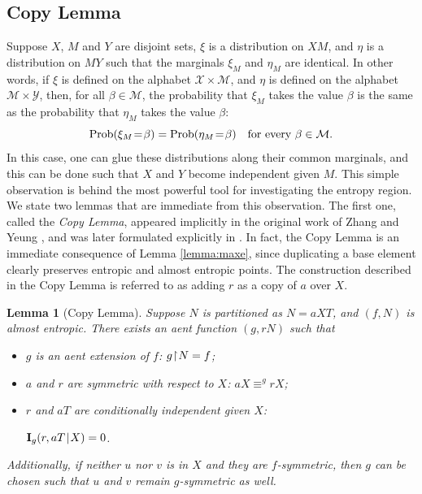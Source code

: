 \documentclass[a4paper]{IEEEtran}
\def\|{\mskip1.5mu{|}\mskip1.5mu}
\def\I{\mathbf I}
\def\m#1{\mskip 1.5mu{#1}\mskip 1.5mu}
\newcommand\restr{\mkern1mu{\upharpoonright}\mkern1mu}
\DeclareMathOperator\Prob{\mathrm{Prob}}
\newtheorem{lemma}[theorem]{Lemma}
\theoremstyle{definition}
\begin{document}
\subsection{Copy Lemma}\label{subsec:copy}

Suppose $X$, $M$ and $Y$ are disjoint sets, $\xi$ is a distribution on $XM$,
and $\eta$ is a distribution on $MY$ such that the marginals $\xi_M$ and
$\eta_M$ are identical. In other words, if $\xi$ is defined on the alphabet
$\mathcal X\times\mathcal M$, and $\eta$ is defined on the alphabet
$\mathcal M\times\mathcal Y$, then, for all $\beta\in\mathcal M$, the
probability that $\xi_M$ takes the value $\beta$ is the same as the
probability that $\eta_M$ takes the value $\beta$:
$$
   \Prob(\xi_M\m=\beta)=\Prob(\eta_M\m=\beta) ~~\mbox{ for every }
   \beta\in\mathcal M.
$$
In this case, one can glue these distributions along their common marginals,
and this can be done such that $X$ and $Y$ become independent given $M$. This
simple observation is behind the most powerful tool for investigating the
entropy region. We state two lemmas that are immediate from this observation.
The first one, called the \emph{Copy Lemma}, appeared implicitly in the
original work of Zhang and Yeung \cite{ZhY.conic, ZhY.ineq}, and was later
formulated explicitly in \cite{DFZ11}. In fact, the Copy Lemma is an
immediate consequence of Lemma \ref{lemma:maxe}, since duplicating a base
element clearly preserves entropic and almost entropic points. The
construction described in the Copy Lemma is referred to as adding $r$ as a copy
of $a$ over $X$.

\begin{lemma}[Copy Lemma]\label{lemma:copy}
Suppose $N$ is partitioned as $N=aXT$, and $(f,N)$ is almost entropic.
There exists an aent function $(g,rN)$ such that
\begin{itemize}
\item[a)] $g$ is an aent extension of $f$: $g\restr N=f$;
\item[b)] $a$ and $r$ are symmetric with respect to $X$: $aX\equiv^g rX$;
\item[c)] $r$ and $aT$ are conditionally independent
given $X$:

$\I_g(r,aT\|X)=0$.
\end{itemize}
Additionally, if neither $u$ nor $v$ is in $X$ and they are $f$-symmetric,
then $g$ can be chosen such that $u$ and $v$ remain $g$-symmetric as well.
\end{lemma}
\end{document}
